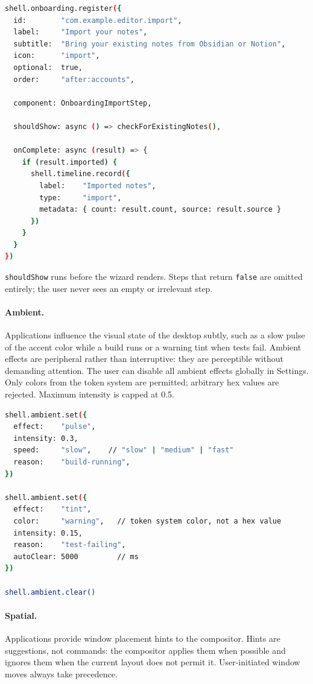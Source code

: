 \begin{lstlisting}[language=bash, caption={shell.onboarding}]
shell.onboarding.register({
  id:        "com.example.editor.import",
  label:     "Import your notes",
  subtitle:  "Bring your existing notes from Obsidian or Notion",
  icon:      "import",
  optional:  true,
  order:     "after:accounts",

  component: OnboardingImportStep,

  shouldShow: async () => checkForExistingNotes(),

  onComplete: async (result) => {
    if (result.imported) {
      shell.timeline.record({
        label:    "Imported notes",
        type:     "import",
        metadata: { count: result.count, source: result.source }
      })
    }
  }
})
\end{lstlisting}

\texttt{shouldShow} runs before the wizard renders. Steps that return
\texttt{false} are omitted entirely; the user never sees an empty or
irrelevant step.

\paragraph{Ambient.}
Applications influence the visual state of the desktop subtly, such as a slow pulse
of the accent color while a build runs or a warning tint when tests fail. Ambient
effects are peripheral rather than interruptive: they are perceptible without
demanding attention. The user can disable all ambient effects globally in
Settings. Only colors from the token system are permitted; arbitrary hex values
are rejected. Maximum intensity is capped at 0.5.

\begin{lstlisting}[language=bash, caption={shell.ambient}]
shell.ambient.set({
  effect:    "pulse",
  intensity: 0.3,
  speed:     "slow",    // "slow" | "medium" | "fast"
  reason:    "build-running",
})

shell.ambient.set({
  effect:    "tint",
  color:     "warning",   // token system color, not a hex value
  intensity: 0.15,
  reason:    "test-failing",
  autoClear: 5000         // ms
})

shell.ambient.clear()
\end{lstlisting}

\paragraph{Spatial.}
Applications provide window placement hints to the compositor. Hints are
suggestions, not commands: the compositor applies them when possible and
ignores them when the current layout does not permit it. User-initiated
window moves always take precedence.

